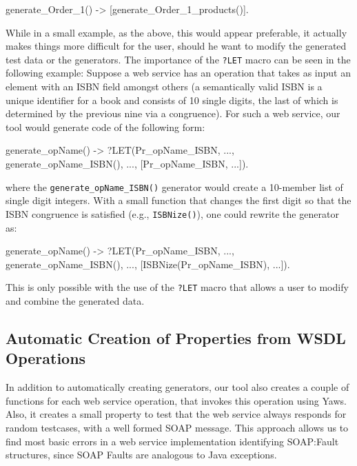 \documentclass[submission,copyright]{eptcs}
\newcommand{\LET}{\texttt{?LET}\xspace}
\begin{document}
\begin{lsterlang}[firstnumber=35]
generate_Order_1() ->
  [generate_Order_1_products()].
\end{lsterlang}

While in a small example, as the above, this would appear preferable,
it actually makes things more difficult for the user, should he want
to modify the generated test data or the generators. The importance of
the \LET macro can be seen in the following example: Suppose a web
service has an operation that takes as input an element with an ISBN
field amongst others (a semantically valid ISBN is a unique identifier
for a book and consists of 10 single digits, the last of which is
determined by the previous nine via a congruence). For such a web
service, our tool would generate code of the following form:
\begin{lsterlang}[numbers=none]
generate_opName() ->
  ?LET({Pr_opName_ISBN, ...},
       {generate_opName_ISBN(), ...},
       [Pr_opName_ISBN, ...]).
\end{lsterlang}
where the \texttt{generate\_opName\_ISBN()} generator would create a
10-member list of single digit integers. With a small function that
changes the first digit so that the ISBN congruence is satisfied (e.g.,
\texttt{ISBNize()}), one could rewrite the generator as:
\begin{lsterlang}[numbers=none]
generate_opName() ->
  ?LET({Pr_opName_ISBN, ...},
       {generate_opName_ISBN(), ...},
       [ISBNize(Pr_opName_ISBN), ...]).
\end{lsterlang}
This is only possible with the use of the \LET macro that allows a user to
modify and combine the generated data. 

\subsection{Automatic Creation of Properties from WSDL Operations}

In addition to automatically creating generators, our tool also
creates a couple of functions for each web service operation, that
invokes this operation using Yaws. Also, it creates a small property
to test that the web service always responds for random testcases, with a
well formed SOAP message. This approach allows us to find most basic
errors in a web service implementation identifying SOAP:Fault
structures, since SOAP Faults are analogous to Java exceptions.
\end{document}
